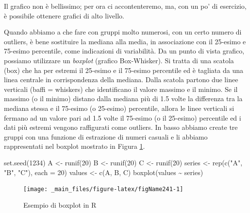 \documentclass[a4paper,12pt,oneside]{book}
\newenvironment{Shaded}{\begin{snugshade}}{\end{snugshade}}
\newcommand{\DecValTok}[1]{#1}
\newcommand{\SpecialCharTok}[1]{#1}
\newcommand{\StringTok}[1]{#1}
\newcommand{\OtherTok}[1]{#1}
\newcommand{\FunctionTok}[1]{#1}
\newcommand{\AttributeTok}[1]{#1}
\newcommand{\NormalTok}[1]{#1}
\begin{document}
Il grafico non è bellissimo; per ora ci accontenteremo, ma, con un po' di esercizio, è possibile ottenere grafici di alto livello.

Quando abbiamo a che fare con gruppi molto numerosi, con un certo numero di outliers, è bene sostituire la mediana alla media, in associazione con il 25-esimo e 75-esimo percentile, come indicazioni di variabilità. Da un punto di vista grafico, possiamo utilizzare un \emph{boxplot} (grafico Box-Whisker). Si tratta di una scatola (box) che ha per estremi il 25-esimo e il 75-esimo percentile ed è tagliata da una linea centrale in corrispondenza della mediana. Dalla scatola partono due linee verticali (baffi = whiskers) che identificano il valore massimo e il minimo. Se il massimo (o il minimo) distano dalla mediana più di 1.5 volte la differenza tra la mediana stessa e il 75-esimo (o 25-esimo) percentile, allora le linee verticali si fermano ad un valore pari ad 1.5 volte il 75-esimo (o il 25-esimo) percentile ed i dati più estremi vengono raffigurati come outliers. In basso abbiamo create tre gruppi con una funzione di estrazione di numeri casuali e li abbiamo rappresentati nel boxplot mostrato in Figura \ref{fig:figName241}.

\begin{Shaded}
\begin{Highlighting}[]
\FunctionTok{set.seed}\NormalTok{(}\DecValTok{1234}\NormalTok{)}
\NormalTok{A }\OtherTok{\textless{}{-}} \FunctionTok{runif}\NormalTok{(}\DecValTok{20}\NormalTok{)}
\NormalTok{B }\OtherTok{\textless{}{-}} \FunctionTok{runif}\NormalTok{(}\DecValTok{20}\NormalTok{)}
\NormalTok{C }\OtherTok{\textless{}{-}} \FunctionTok{runif}\NormalTok{(}\DecValTok{20}\NormalTok{)}
\NormalTok{series }\OtherTok{\textless{}{-}} \FunctionTok{rep}\NormalTok{(}\FunctionTok{c}\NormalTok{(}\StringTok{"A"}\NormalTok{, }\StringTok{"B"}\NormalTok{, }\StringTok{"C"}\NormalTok{), }\AttributeTok{each =} \DecValTok{20}\NormalTok{)}
\NormalTok{values }\OtherTok{\textless{}{-}} \FunctionTok{c}\NormalTok{(A, B, C)}
\FunctionTok{boxplot}\NormalTok{(values }\SpecialCharTok{\textasciitilde{}}\NormalTok{ series)}
\end{Highlighting}
\end{Shaded}

\begin{figure}

{\centering \texttt{[image: \_main\_files/figure-latex/figName241-1]} 

}

\caption{Esempio di boxplot in R}\label{fig:figName241}
\end{figure}
\end{document}
